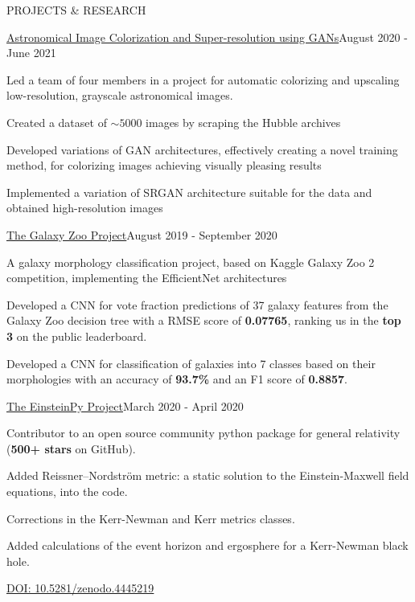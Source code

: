 \documentclass{resume} %
\begin{document}
\begin{rSection}{PROJECTS \& RESEARCH}

\begin{rSubsection}{\href{https://github.com/obi-wan-shinobi/Astronomical-Image-Colorization}{Astronomical Image Colorization and Super-resolution using GANs}}{August 2020 - June 2021}{}{}
\vspace{-0.9em}
\item Led a team of four members in a project for automatic colorizing and upscaling low-resolution, grayscale astronomical images.
\item Created a dataset of $\sim 5000$ images by scraping the Hubble archives
\item Developed variations of GAN architectures, effectively creating a novel training method, for colorizing images achieving visually pleasing results
\item Implemented a variation of SRGAN architecture suitable for the data and obtained high-resolution images
\end{rSubsection}

\begin{rSubsection}{\href{https://github.com/obi-wan-shinobi/GalaxyEfficientNets}{The Galaxy Zoo Project}}{August 2019 - September 2020}{}{}
\vspace{-0.9em}
\item A galaxy morphology classification project, based on Kaggle Galaxy Zoo 2 competition, implementing the EfficientNet architectures
\item Developed a CNN for vote fraction predictions of 37 galaxy features from the Galaxy Zoo decision tree with a RMSE score of \textbf{0.07765}, ranking us in the \textbf{top 3} on the public leaderboard.
\item Developed a CNN for classification of galaxies into 7 classes based on their morphologies with an accuracy of \textbf{93.7\%} and an F1 score of \textbf{0.8857}.
\end{rSubsection}

\begin{rSubsection}{\href{https://github.com/einsteinpy/einsteinpy}{The EinsteinPy Project}}{March 2020 - April 2020}{}{}
\vspace{-0.9em}
\item Contributor to an open source community python package for general relativity (\textbf{500+ stars} on GitHub).
\item Added Reissner–Nordström metric: a static solution to the Einstein-Maxwell field equations, into the code.
\item Corrections in the Kerr-Newman and Kerr metrics classes.
\item Added calculations of the event horizon and ergosphere for a Kerr-Newman black hole.
\item \href{https://doi.org/10.5281/zenodo.4445219
}{DOI: 10.5281/zenodo.4445219}
\end{rSubsection}


\end{rSection}
\end{document}
